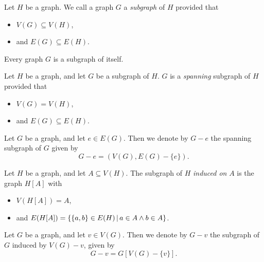\begin{defn}
    Let $H$ be a graph. We call a graph $G$ a \emph{subgraph} of $H$ provided that
    \begin{itemize}
        \item $V(G) \subseteq V(H)$,
        \item and $E(G) \subseteq E(H)$.
    \end{itemize}
\end{defn}

\begin{rmk}
    Every graph $G$ is a subgraph of itself.
\end{rmk}

\begin{defn}
    Let $H$ be a graph, and let $G$ be a subgraph of $H$. $G$ is a \emph{spanning} subgraph of $H$ provided that
    \begin{itemize}
        \item $V(G) = V(H)$,
        \item and $E(G) \subseteq E(H)$.
    \end{itemize}
\end{defn}

\begin{defn}
    Let $G$ be a graph, and let $e \in E(G)$. Then we denote by $G - e$ the spanning subgraph of $G$ given by \[G - e = (V(G), E(G) - \{e\}).\]
\end{defn}

\begin{defn}
    Let $H$ be a graph, and let $A \subseteq V(H)$. The subgraph of $H$ \emph{induced on} $A$ is the graph $H[A]$ with
    \begin{itemize}
        \item $V(H[A]) = A$,
        \item and $E(H[A]) = \left\{\{a, b\} \in E(H) \,\middle|\, a \in A \land b \in A\right\}$.
    \end{itemize}
\end{defn}

\begin{defn}
    Let $G$ be a graph, and let $v \in V(G)$. Then we denote by $G - v$ the subgraph of $G$ induced by $V(G) - v$, given by \[G - v = G[V(G) - \{v\}].\]
\end{defn}

